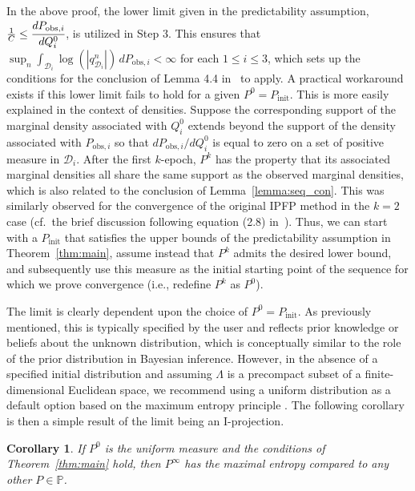\documentclass{article}
\newcounter{rmrk}[section]
\newenvironment{rem}{\stepcounter{rmrk}
\noindent {\newline \bf Remark
\arabic{section}.\arabic{rmrk}.\ }}{\newline}
\newtheorem{corollary}{Corollary}[section]
\newcommand{\p}{\mathbb{P}}
\newcommand{\initmeas}{P_{\text{init}}}
\begin{document}
\begin{rem} 
In the above proof, the lower limit given in the predictability assumption, $\frac{1}{C}\leq \cfrac{dP_{\text{obs},i}}{dQ^0_i}$, is utilized in Step 3.
This ensures that $\sup_n \int_{\mathcal{D}_i} \log\left(|q_{\mathcal{D}_i}^n|\right)\, dP_{\text{obs},i}<\infty$ for each $1\leq i\leq 3$, which sets up the conditions for the conclusion of Lemma 4.4 in~\cite{Ruschendorf1995} to apply.
A practical workaround exists if this lower limit fails to hold for a given $P^0=\initmeas$. 
This is more easily explained in the context of densities.
Suppose the corresponding support of the marginal density associated with $Q^0_i$ extends beyond the support of the density associated with $P_{\text{obs},i}$ so that $dP_{\text{obs},i} / dQ^0_i$ is equal to zero on a set of positive measure in $\mathcal{D}_i$. 
After the first $k$-epoch, $P^k$ has the property that its associated marginal densities all share the same support as the observed marginal densities, which is also related to the conclusion of Lemma~\ref{lemma:seq_con}. 
This was similarly observed for the convergence of the original IPFP method in the $k=2$ case (cf.~the brief discussion following equation (2.8) in~\cite{Ruschendorf1995}). 
Thus, we can start with a $\initmeas$ that satisfies the upper bounds of the predictability assumption in Theorem~\ref{thm:main}, assume instead that $P^k$ admits the desired lower bound, and subsequently use this measure as the initial starting point of the sequence for which we prove convergence (i.e., redefine $P^k$ as $P^0$).
\end{rem}

The limit is clearly dependent upon the choice of $P^{0}=\initmeas$. 
As previously mentioned, this is typically specified by the user and reflects prior knowledge or beliefs about the unknown distribution, which is conceptually similar to the role of the prior distribution in Bayesian inference. 
However, in the absence of a specified initial distribution and assuming $\Lambda$ is a precompact subset of a finite-dimensional Euclidean space, we recommend using a uniform distribution as a default option based on the maximum entropy principle \cite{Guiasu1985}.
The following corollary is then a simple result of the limit being an I-projection. 

\begin{corollary}
If $P^{0}$ is the uniform measure and the conditions of Theorem~\ref{thm:main} hold, then $P^{\infty}$ has the maximal entropy compared to any other $P \in \p$.    
\end{corollary}
\end{document}
